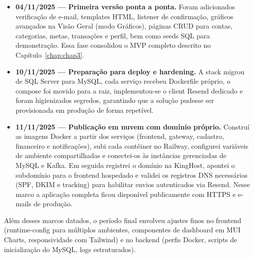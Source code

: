 \begin{itemize}
    \item \textbf{04/11/2025 — Primeira versão ponta a ponta.} Foram adicionados verificação de e-mail, templates HTML, listener de confirmação, gráficos avançados na Visão Geral (modo Gráficos), páginas CRUD para contas, categorias, metas, transações e perfil, bem como seeds SQL para demonstração. Essa fase consolidou o MVP completo descrito no Capítulo~\ref{chap:chap3}.

    \item \textbf{10/11/2025 — Preparação para deploy e hardening.} A stack migrou de SQL Server para MySQL, cada serviço recebeu Dockerfile próprio, o compose foi movido para a raiz, implementou-se o client Resend dedicado e foram higienizados segredos, garantindo que a solução pudesse ser provisionada em produção de forma repetível.

    \item \textbf{11/11/2025 — Publicação em nuvem com domínio próprio.} Construí as imagens Docker a partir dos serviços (frontend, gateway, cadastro, financeiro e notificações), subi cada contêiner no Railway, configurei variáveis de ambiente compartilhadas e conectei-os às instâncias gerenciadas de MySQL e Kafka. Em seguida registrei o domínio  na KingHost, apontei o subdomínio  para o frontend hospedado e validei os registros DNS necessários (SPF, DKIM e tracking) para habilitar envios autenticados via Resend. Nesse marco a aplicação completa ficou disponível publicamente com HTTPS e e-mails de produção.
\end{itemize}

Além desses marcos datados, o período final envolveu ajustes finos no frontend (runtime-config para múltiplos ambientes, componentes de dashboard em MUI Charts, responsividade com Tailwind) e no backend (perfis Docker, scripts de inicialização do MySQL, logs estruturados).
